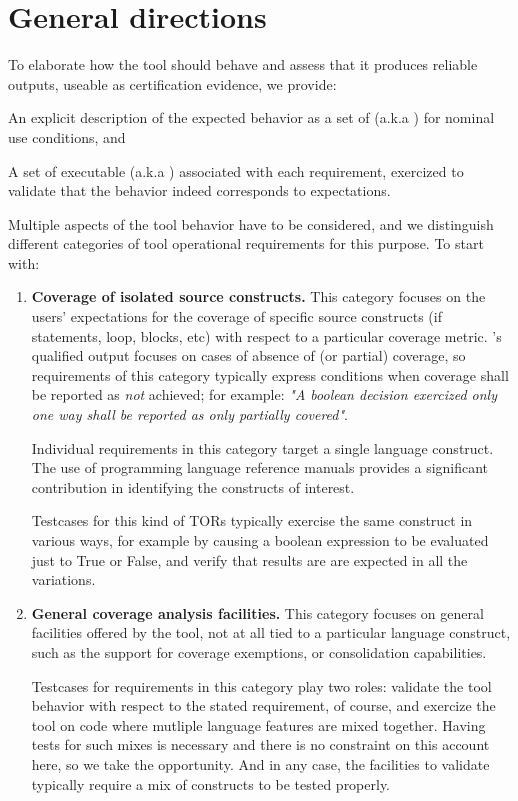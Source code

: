 \documentclass {report}
\begin{document}
\section{General directions}

To elaborate how the tool should behave and assess that it produces reliable
outputs, useable as certification evidence, we provide:

\begin{Itemize}
\item%
  An explicit description of the expected behavior as a set of  (a.k.a ) for nominal use conditions,
  and
\item%
  A set of executable  (a.k.a ) associated with
  each requirement, exercized to validate that the behavior indeed corresponds
  to expectations.
\end{Itemize}

Multiple aspects of the tool behavior have to be considered, and we
distinguish different categories of tool operational requirements for this
purpose.
%
To start with:

\begin{enumerate}
\item \textbf{Coverage of isolated source constructs.}
%
This category focuses on the users' expectations for the coverage of
specific source constructs (if statements, loop, blocks, etc) with respect to
a particular coverage metric.
%
\xcov{}'s qualified output focuses on cases of absence of (or partial)
coverage, so requirements of this category typically express conditions when
coverage shall be reported as \emph{not} achieved;
%
for example: \emph{"A boolean decision exercized only one way shall be
reported as only partially covered"}.

Individual requirements in this category target a single language construct.
%
The use of programming language reference manuals provides a significant
contribution in identifying the constructs of interest.

Testcases for this kind of TORs typically exercise the same construct in
various ways, for example by causing a boolean expression to be evaluated just
to True or False, and verify that results are are expected in all the
variations.

\item \textbf{General coverage analysis facilities.}
%
This category focuses on general facilities offered by the tool, not at all
tied to a particular language construct, such as the support for coverage
exemptions, or consolidation capabilities.

Testcases for requirements in this category play two roles: validate the tool
behavior with respect to the stated requirement, of course, and exercize the
tool on code where mutliple language features are mixed together.
%
Having tests for such mixes is necessary and there is no constraint on this
account here, so we take the opportunity.
% 
And in any case, the facilities to validate typically require a mix of
constructs to be tested properly.
\end{enumerate}
\end{document}
